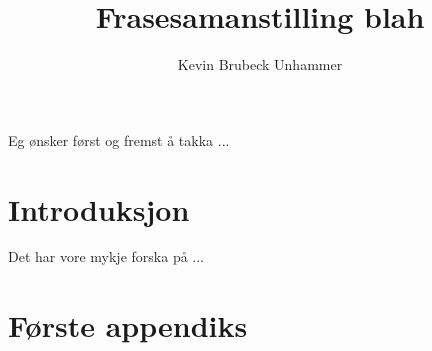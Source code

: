 \documentclass[nynorsk,utf]{uib-mi-master}
\author{Kevin Brubeck Unhammer}
\title{Frasesamanstilling blah}
\begin{document}
 
\makefront 
Eg ønsker først og fremst å takka ... 
\tableofcontents 
\makemain 
\chapter{Introduksjon} 
Det har vore mykje forska på ... 
\nocite{kilgarriff1997dbw}
\appendix 
\chapter{Første appendiks} 
\raggedright 
 
\end{document}
